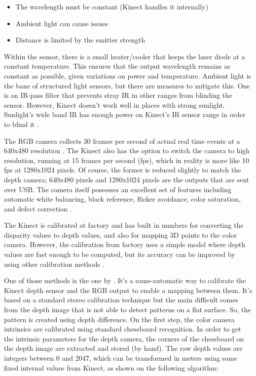 \documentclass[msc, a4paper, classic, en]{ufbathesis}
\begin{document}
\begin{itemize}
  \item The wavelength must be constant (Kinect handles it internally)
  \item Ambient light can cause issues
  \item Distance is limited by the emitter strength
\end{itemize}

Within the sensor, there is a small heater/cooler that keeps the laser diode at a constant temperature. This ensures that the output wavelength remains as constant as possible, given variations on power and temperature. Ambient light is the bane of structured light sensors, but there are measures to mitigate this. One is an IR-pass filter that prevents stray IR in other ranges from blinding the sensor. However, Kinect doesn't work well in places with strong sunlight. Sunlight's wide band IR has enough power on Kinect's IR sensor range in order to blind it \cite{hackingkinect}.

The RGB camera collects 30 frames per second of actual real time events at a 640x480 resolution \cite{kinecthacks}. The Kinect also has the option to switch the camera to high resolution, running at 15 frames per second (fps), which in reality is more
like 10 fps at 1280x1024 pixels. Of course, the former is reduced slightly to match the depth camera;
640x480 pixels and 1280x1024 pixels are the outputs that are sent over USB. The camera itself possesses
an excellent set of features including automatic white balancing, black reference, flicker avoidance, color
saturation, and defect correction \cite{hackingkinect}.

The Kinect is calibrated at factory and has built in numbers for converting the disparity values to depth values, and also for mapping 3D points to the color camera. However, the calibration from factory uses a simple model where depth values are fast enough to be computed, but its accuracy can be improved by using other calibration methods \cite{magnus2013}.

One of those methods is the one by \cite{burruscal}. It's a same-automatic way to calibrate the Kinect depth sensor and the RGB output to enable a mapping between them. It's based on a standard stereo calibration technique but the main difficult comes from the depth image that is not able to detect patterns on a flat surface. So, the pattern is created using depth difference. On the first step, the color camera intrinsics are calibrated using standard chessboard recognition. In order to get the intrinsic parameters for the depth camera, the corners of the chessboard on the depth image are extracted and stored (by hand). The raw depth values are integers between 0 and 2047, which can be transformed in meters using some fixed internal values from Kinect, as shown on the following algorithm:
\end{document}
